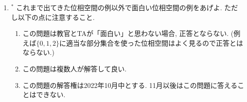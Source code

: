 \documentclass[dvipdfmx,a4paper,11pt]{article}
\theoremstyle{definition}
\begin{document}
\begin{enumerate}[ label=\textbf{問}4.\arabic*]
\item  $^{*}$ これまで出てきた位相空間の例以外で面白い位相空間の例をあげよ. ただし以下の点に注意すること.
	\begin{enumerate}
	\item この問題は教官とTAが「面白い」と思わない場合, 正答とならない. (例えば$\{ 0,1,2\}$に適当な部分集合を使った位相空間はよく見るので正答とはならない.)
	\item この問題は複数人が解答して良い.
	\item この問題の解答権は2022年10月中とする. 11月以後はこの問題に答えることはできない. 
	\end{enumerate}

 \end{enumerate}





 
\end{document}
